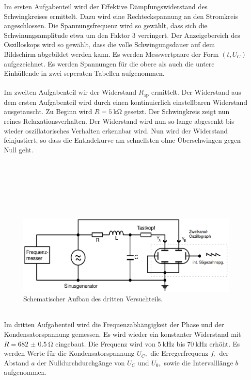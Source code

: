Im ersten Aufgabenteil wird der Effektive Dämpfungswiderstand des Schwingkreises ermittelt. Dazu wird eine Rechteckspannung an den Stromkreis angeschlossen.
Die Spannungsfrequenz wird so gewählt, dass sich die Schwinungsamplitude etwa um den Faktor 3 verringert. 
Der Anzeigebereich des Oszilloskops wird so gewählt, dass die volle Schwingungsdauer auf dem Bildschirm abgebildet werden kann.
Es werden Messwertpaare der Form $(t, U_C)$ aufgezeichnet. Es werden Spannungen für die obere als auch die untere Einhüllende in zwei seperaten Tabellen aufgenommen.\\
\\
Im zweiten Aufgabenteil wir der Widerstand $R_{\text{ap}}$ ermittelt. Der Widerstand aus dem ersten Aufgabenteil wird durch einen kontinuierlich einstellbaren Widerstand ausgetauscht.
Zu Beginn wird $R = \SI{5}{\kilo\ohm}$ gesetzt. Der Schwingkreis zeigt nun reines Relaxationsverhalten. 
Der Widerstand wird nun so lange abgesenkt bis wieder oszillatorisches Verhalten erkennbar wird. Nun wird
der Widerstand feinjustiert, so dass die Entladekurve am schnellsten ohne Überschwingen gegen Null geht.\\
\\
\\
\\
\\
\\
\\
\begin{figure}[h]
    \centering
    \includegraphics[width=\linewidth]{img/Kreis2.png}
    \caption{Schematischer Aufbau des dritten Versuchteils.\cite{V354}}
    \label{fig:Aufbau2}
\end{figure}
\\
Im dritten Aufgabenteil wird die Frequenzabhängigkeit der Phase und der Kondensatorspannung gemessen.
Es wird wieder ein konstanter Widerstand mit $R = \SI{682(0.5)}{\ohm}$ eingebaut. 
Die Frequenz wird von $\SI{5}{\kilo\hertz}$ bis $\SI{70}{\kilo\hertz}$ erhöht. Es werden Werte für die Kondensatorspannung $U_C,$ die Erregerfrequenz $f,$ der Abstand $a$ der Nulldurchdurchgänge von $U_C$ und $U_0,$ sowie die Intervalllänge $b$ aufgenommen.\\
\\